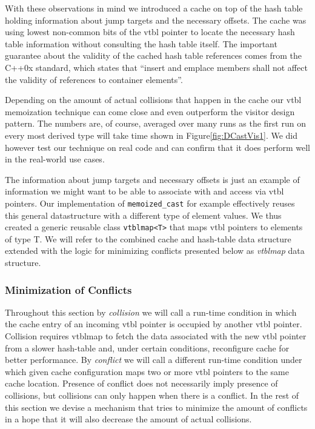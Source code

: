 \documentclass[preprint]{sigplanconf}
\makeatletter
\DeclareRobustCommand{\code}[1]{{\lstinline[breaklines=false,escapechar=@]{#1}}}
\makeatother
\begin{document}
With these observations in mind we introduced a cache on top of the hash table 
holding information about jump targets and the necessary offsets. The cache was 
using lowest non-common bits of the vtbl pointer to locate the necessary hash 
table information without consulting the hash table itself. The important 
guarantee about the validity of the cached hash table references comes from the 
C++0x standard, which states that ``insert and emplace members shall not affect 
the validity of references to container elements''\cite[.5(13)]{C++0x}. 

Depending on the amount of actual collisions that happen in the cache our vtbl 
memoization technique can come close and even outperform the visitor design 
pattern. The numbers are, of course, averaged over many runs as the first run on 
every most derived type will take time shown in Figure\ref{fig:DCastVis1}. We 
did however test our technique on real code and can confirm that it does perform 
well in the real-world use cases.

The information about jump targets and necessary offsets is just an example of 
information we might want to be able to associate with and access via vtbl 
pointers. Our implementation of \code{memoized_cast} for example effectively 
reuses this general datastructure with a different type of element values. 
We thus created a generic reusable class \code{vtblmap<T>} that maps vtbl 
pointers to elements of type T. We will refer to the combined cache and 
hash-table data structure extended with the logic for minimizing conflicts 
presented below as \emph{vtblmap} data structure.

\subsubsection{Minimization of Conflicts}
\label{sec:moc}

Throughout this section by \emph{collision} we will call a run-time condition in 
which the cache entry of an incoming vtbl pointer is occupied by another vtbl 
pointer. Collision requires vtblmap to fetch the data associated with the new 
vtbl pointer from a slower hash-table and, under certain conditions, reconfigure 
cache for better performance. By \emph{conflict} we will call a different 
run-time condition under which given cache configuration maps two or more vtbl 
pointers to the same cache location. Presence of conflict does not necessarily 
imply presence of collisions, but collisions can only happen when there is a 
conflict. In the rest of this section we devise a mechanism that tries to 
minimize the amount of conflicts in a hope that it will also decrease the amount 
of actual collisions.
\end{document}
